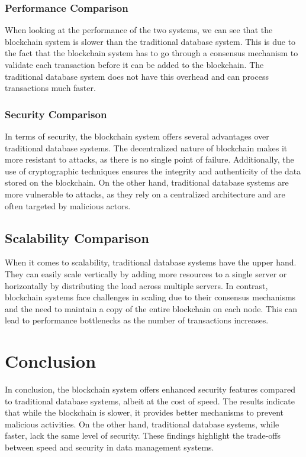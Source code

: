 \documentclass[conference]{IEEEtran} %
\begin{document}
\subsubsection{Performance Comparison} %
When looking at the performance of the two systems, we can see that the blockchain system is slower than the traditional database system. This is due to the fact that the blockchain system has to go through a consensus mechanism to validate each transaction before it can be added to the blockchain. The traditional database system does not have this overhead and can process transactions much faster.

\subsubsection{Security Comparison} %
In terms of security, the blockchain system offers several advantages over traditional database systems. The decentralized nature of blockchain makes it more resistant to attacks, as there is no single point of failure. Additionally, the use of cryptographic techniques ensures the integrity and authenticity of the data stored on the blockchain. On the other hand, traditional database systems are more vulnerable to attacks, as they rely on a centralized architecture and are often targeted by malicious actors.

\subsection{Scalability Comparison} %
When it comes to scalability, traditional database systems have the upper hand. They can easily scale vertically by adding more resources to a single server or horizontally by distributing the load across multiple servers. In contrast, blockchain systems face challenges in scaling due to their consensus mechanisms and the need to maintain a copy of the entire blockchain on each node. This can lead to performance bottlenecks as the number of transactions increases.

\section{Conclusion} %
In conclusion, the blockchain system offers enhanced security features compared to traditional database systems, albeit at the cost of speed. The results indicate that while the blockchain is slower, it provides better mechanisms to prevent malicious activities. On the other hand, traditional database systems, while faster, lack the same level of security. These findings highlight the trade-offs between speed and security in data management systems.
\end{document}
